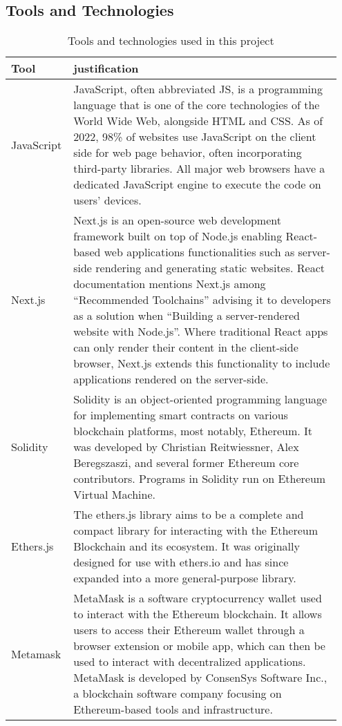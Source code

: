 
\subsection{Tools and Technologies}

\begin{longtable}{p{0.15\linewidth} | p{0.80\linewidth}}
  \caption{Tools and technologies used in this project}
  \label{tab:toolsAndTech}
  \\\toprule
  \centering
  Tool & justification
  \\\midrule
  JavaScript & {
    JavaScript, often abbreviated JS, is a programming language that is one of the core technologies of the World Wide Web, alongside HTML and CSS. As of 2022, 98\% of websites use JavaScript on the client side for web page behavior, often incorporating third-party libraries. All major web browsers have a dedicated JavaScript engine to execute the code on users' devices.
  }
  \\\hline
  Next.js & {
    Next.js is an open-source web development framework built on top of Node.js enabling React-based web applications functionalities such as server-side rendering and generating static websites. React documentation mentions Next.js among ``Recommended Toolchains'' advising it to developers as a solution when ``Building a server-rendered website with Node.js''. Where traditional React apps can only render their content in the client-side browser, Next.js extends this functionality to include applications rendered on the server-side.
  }
  \\\hline
  Solidity & {
    Solidity is an object-oriented programming language for implementing smart contracts on various blockchain platforms, most notably, Ethereum. It was developed by Christian Reitwiessner, Alex Beregszaszi, and several former Ethereum core contributors. Programs in Solidity run on Ethereum Virtual Machine.
  }
  \\\hline
  Ethers.js & {
    The ethers.js library aims to be a complete and compact library for interacting with the Ethereum Blockchain and its ecosystem. It was originally designed for use with ethers.io and has since expanded into a more general-purpose library.
  }
  \\\hline
  Metamask & {
    MetaMask is a software cryptocurrency wallet used to interact with the Ethereum blockchain. It allows users to access their Ethereum wallet through a browser extension or mobile app, which can then be used to interact with decentralized applications. MetaMask is developed by ConsenSys Software Inc., a blockchain software company focusing on Ethereum-based tools and infrastructure.
}
\end{longtable}
